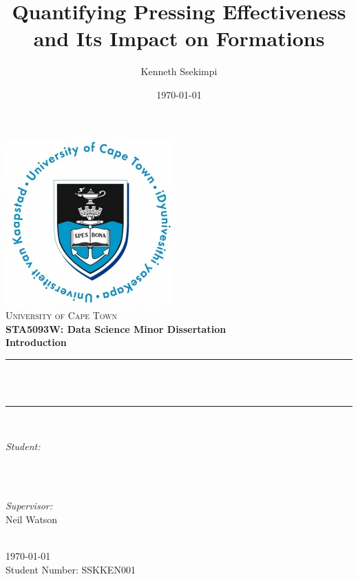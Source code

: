 \documentclass[12pt]{article}
\title{Quantifying Pressing Effectiveness and Its Impact on Formations}								%
\author{Kenneth Ssekimpi}								%
\date{\today}											%
\makeatletter
\let\thetitle\@title
\let\theauthor\@author
\makeatother
\begin{document}

\begin{titlepage}
        \centering
    \vspace*{0.5 cm}
    \includegraphics[scale = 0.75]{UCT Logo.jpg}\\[1.0 cm]	%
    \textsc{\LARGE University of Cape Town}\\[0.5 cm]	%
    \textbf{\Large STA5093W: Data Science Minor Dissertation}\\[0.5 cm]				%
	\textbf{\large Introduction}\\[0.5 cm]				%
	\rule{\linewidth}{0.2 mm} \\[0.4 cm]
	{ \huge \bfseries \thetitle}\\
	\rule{\linewidth}{0.2 mm} \\[1.5 cm]
	
	\begin{minipage}{0.4\textwidth}
		\begin{flushleft} \large
			\emph{Student:}\\
			\theauthor \\
			\end{flushleft}
			\end{minipage}~
			\begin{minipage}{0.4\textwidth}
			\begin{flushright} \large
			\emph{Supervisor:} \\
			Neil Watson									
		\end{flushright}
	\end{minipage}\\[2 cm]

\today \\
Student Number: SSKKEN001 \\
	
\end{titlepage}
\end{document}
